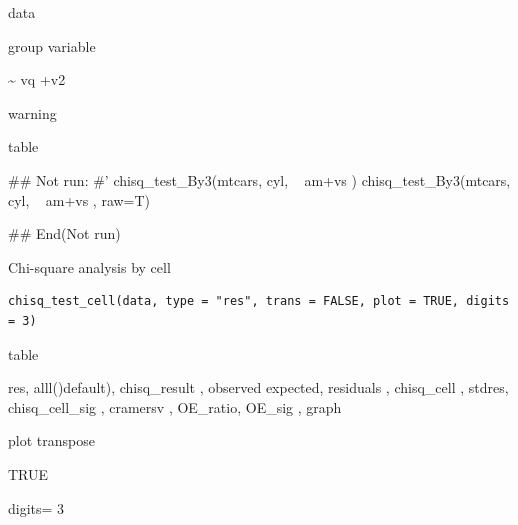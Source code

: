 \documentclass[a4paper]{book}
\begin{document}
%
\begin{Arguments}
\begin{ldescription}
\item[\code{data}] data

\item[\code{grp}] group variable

\item[\code{formula}] \textasciitilde{} vq +v2

\item[\code{raw}] warning
\end{ldescription}
\end{Arguments}
%
\begin{Value}
table
\end{Value}
%
\begin{Examples}
\begin{ExampleCode}

## Not run: 
#'
chisq_test_By3(mtcars, cyl, ~ am+vs )
chisq_test_By3(mtcars, cyl, ~ am+vs , raw=T)


## End(Not run)
\end{ExampleCode}
\end{Examples}
%
\begin{Description}
Chi-square analysis by cell
\end{Description}
%
\begin{Usage}
\begin{verbatim}
chisq_test_cell(data, type = "res", trans = FALSE, plot = TRUE, digits = 3)
\end{verbatim}
\end{Usage}
%
\begin{Arguments}
\begin{ldescription}
\item[\code{data}] table

\item[\code{type}] res, alll()default), chisq\_result , observed   expected,   residuals ,  chisq\_cell ,  stdres, chisq\_cell\_sig ,  cramersv ,  OE\_ratio,    OE\_sig ,   graph

\item[\code{trans}] plot transpose

\item[\code{plot}] TRUE

\item[\code{digits}] digits= 3
\end{ldescription}
\end{Arguments}
\end{document}
